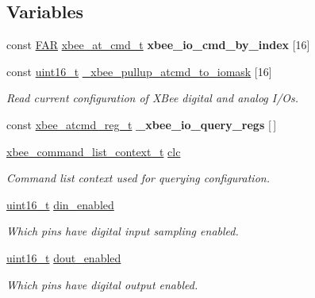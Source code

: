 \subsection*{Variables}
\begin{DoxyCompactItemize}
\item 
const \hyperlink{group__hal_gaef060b3456fdcc093a7210a762d5f2ed}{F\+AR} \hyperlink{unionxbee__at__cmd__t}{xbee\+\_\+at\+\_\+cmd\+\_\+t} {\bfseries xbee\+\_\+io\+\_\+cmd\+\_\+by\+\_\+index} \mbox{[}16\mbox{]}
\item 
const \hyperlink{group__hal__dos_ga5a8b2dc9e45a9ee81a94ef304fb62505}{uint16\+\_\+t} \hyperlink{group__xbee__io_gabcf9c9881057623ef7b28330631fad9b}{\+\_\+xbee\+\_\+pullup\+\_\+atcmd\+\_\+to\+\_\+iomask} \mbox{[}16\mbox{]}
\begin{DoxyCompactList}\small\item\em Read current configuration of X\+Bee digital and analog I/\+Os. \end{DoxyCompactList}\item 
const \hyperlink{structxbee__atcmd__reg__t}{xbee\+\_\+atcmd\+\_\+reg\+\_\+t} {\bfseries \+\_\+xbee\+\_\+io\+\_\+query\+\_\+regs} \mbox{[}$\,$\mbox{]}
\item 
\mbox{\label{group__xbee__io_ga55f4e774c0eb8d8dfbcdb7f1faff5ef6}} 
\hyperlink{structxbee__command__list__context__t}{xbee\+\_\+command\+\_\+list\+\_\+context\+\_\+t} \hyperlink{group__xbee__io_ga55f4e774c0eb8d8dfbcdb7f1faff5ef6}{clc}
\begin{DoxyCompactList}\small\item\em Command list context used for querying configuration. \end{DoxyCompactList}\item 
\hyperlink{group__hal__dos_ga5a8b2dc9e45a9ee81a94ef304fb62505}{uint16\+\_\+t} \hyperlink{group__xbee__io_gabf150485c21c63b46d511cb50b2bf2df}{din\+\_\+enabled}
\begin{DoxyCompactList}\small\item\em Which pins have digital input sampling enabled. \end{DoxyCompactList}\item 
\hyperlink{group__hal__dos_ga5a8b2dc9e45a9ee81a94ef304fb62505}{uint16\+\_\+t} \hyperlink{group__xbee__io_gab9c5cc4d30d476f26698c96f9aa329fe}{dout\+\_\+enabled}
\begin{DoxyCompactList}\small\item\em Which pins have digital output enabled. \end{DoxyCompactList}\item 

\end{DoxyCompactItemize}
